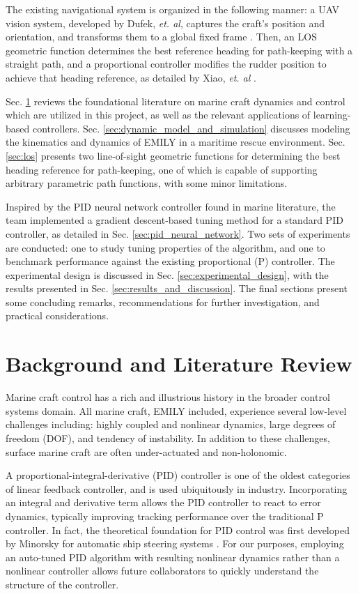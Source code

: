 \documentclass[conference]{IEEEtran}
\newcommand{\incomplete}{\framebox{\textbf{fill this in}}}
\begin{document}
The existing navigational system is organized in the following manner: a UAV vision system, developed by Dufek, \textit{et. al}, captures the craft's position and orientation, and transforms them to a global fixed frame \cite{dufek2016visual}. Then, an LOS geometric function determines the best reference heading for path-keeping with a straight path, and a proportional controller modifies the rudder position to achieve that heading reference, as detailed by Xiao, \textit{et. al} \cite{xiao2017uav}.  

Sec. \ref{sec:background} reviews the foundational literature on marine craft dynamics and control which are utilized in this project, as well as the relevant applications of learning-based controllers. Sec. \ref{sec:dynamic_model_and_simulation} discusses modeling the kinematics and dynamics of EMILY in a maritime rescue environment. Sec. \ref{sec:los} presents two line-of-sight geometric functions for determining the best heading reference for path-keeping, one of which is capable of supporting arbitrary parametric path functions, with some minor limitations. 

Inspired by the PID neural network controller found in marine literature, the team implemented a gradient descent-based tuning method for a standard PID controller, as detailed in Sec. \ref{sec:pid_neural_network}. Two sets of experiments are conducted: one to study tuning properties of the algorithm, and one to benchmark performance against the existing proportional (P) controller. The experimental design is discussed in Sec. \ref{sec:experimental_design}, with the results presented in Sec. \ref{sec:results_and_discussion}. The final sections present some concluding remarks, recommendations for further investigation, and practical considerations.

\section{Background and Literature Review}\label{sec:background}
Marine craft control has a rich and illustrious history in the broader control systems domain. All marine craft, EMILY included, experience several low-level challenges including: highly coupled and nonlinear dynamics, large degrees of freedom (DOF), and tendency of instability. In addition to these challenges, surface marine craft are often under-actuated and non-holonomic.

A proportional-integral-derivative (PID) controller is one of the oldest categories of linear feedback controller, and is used ubiquitously in industry. Incorporating an integral and derivative term allows the PID controller to react to error dynamics, typically improving tracking performance over the traditional P controller. In fact, the theoretical foundation for PID control was first developed by Minorsky for automatic ship steering systems \cite{minorsky1922directional}. For our purposes, employing an auto-tuned PID algorithm with resulting nonlinear dynamics rather than a nonlinear controller allows future collaborators to quickly understand the structure of the controller.
\end{document}
